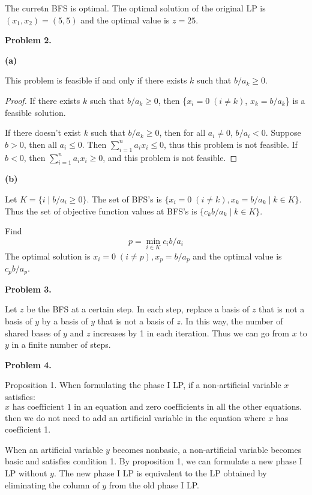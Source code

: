 \documentclass[12pt]{article}
\begin{document}
The curretn BFS is optimal. The optimal solution of the original LP is $(x_1,x_2) = (5,5)$ and the optimal value is $z=25$.

\vspace{\baselineskip}
\noindent
\textbf{Problem 2.}

\noindent
\textbf{(a)}

This problem is feasible if and only if there exists $k$ such that $b/a_k \ge 0$.
\begin{proof}
If there exists $k$ such that $b/a_k \ge 0$, then \{$ x_i = 0 \; (i \ne k)$, $x_k = b/a_k$\} is a feasible solution.

If there doesn't exist $k$ such that $b/a_k \ge 0$, then for all $a_i \ne 0$, $b/a_i < 0$. Suppose $b>0$, then all $a_i \le 0$. Then $\sum_{i=1}^n a_ix_i \le 0 $, thus this problem is not feasible. If $b<0$, then $\sum_{i=1}^n a_ix_i \ge 0 $, and this problem is not feasible.
\end{proof}

\noindent
\textbf{(b)}

Let $K=\{i \mid b/a_i \ge 0\}$.
The set of BFS's is $\{x_i = 0\;(i \ne k), x_k = b/a_k  \mid k\in K\}$. Thus the set of objective function values at BFS's is $\{c_k b / a_k  \mid k\in K\}$.

 Find \[ p = \min_{i\in K} c_i b / a_i \] The optimal solution is $x_i = 0 \; (i\ne p), x_p = b/a_p$ and the optimal value is $c_pb/a_p$.

\vspace{\baselineskip}
\noindent
\textbf{Problem 3.}

Let $z$ be the BFS at a certain step. In each step, replace a basis of $z$ that is not a basis of $y$ by a basis of $y$ that is not a basis of $z$. In this way, the number of shared bases of $y$ and $z$ increases by 1 in each iteration. Thus we can go from $x$ to $y$ in a finite number of steps.

\vspace{\baselineskip}
\noindent
\textbf{Problem 4.}

\noindent
Proposition 1. When formulating the phase I LP, if a non-artificial variable $x$ satisfies:
\[\text{$x$ has coefficient 1 in an equation and zero coefficients in all the other equations. (condition 1)}\]
then we do not need to add an artificial variable in the equation where $x$ has coefficient 1.

When an artificial variable $y$ becomes nonbasic, a non-artificial variable becomes basic and satisfies condition 1. By proposition 1, we can formulate a new phase I LP without $y$. The new phase I LP is equivalent to the LP obtained by eliminating the column of $y$ from the old phase I LP.
\end{document}
